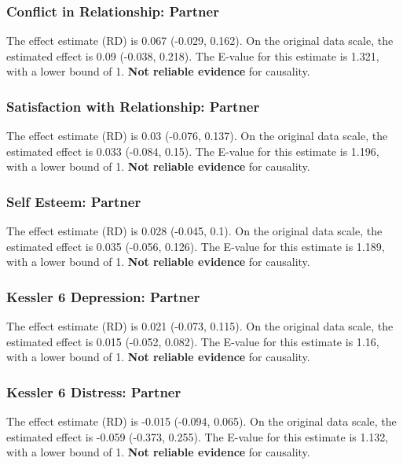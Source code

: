 \documentclass[
  singlecolumn]{article}
\begin{document}
\subsubsection{Conflict in Relationship:
Partner}\label{conflict-in-relationship-partner-15}

The effect estimate (RD) is 0.067 (-0.029, 0.162). On the original data
scale, the estimated effect is 0.09 (-0.038, 0.218). The E-value for
this estimate is 1.321, with a lower bound of 1. \textbf{Not reliable
evidence} for causality.

\subsubsection{Satisfaction with Relationship:
Partner}\label{satisfaction-with-relationship-partner-15}

The effect estimate (RD) is 0.03 (-0.076, 0.137). On the original data
scale, the estimated effect is 0.033 (-0.084, 0.15). The E-value for
this estimate is 1.196, with a lower bound of 1. \textbf{Not reliable
evidence} for causality.

\subsubsection{Self Esteem: Partner}\label{self-esteem-partner-15}

The effect estimate (RD) is 0.028 (-0.045, 0.1). On the original data
scale, the estimated effect is 0.035 (-0.056, 0.126). The E-value for
this estimate is 1.189, with a lower bound of 1. \textbf{Not reliable
evidence} for causality.

\subsubsection{Kessler 6 Depression:
Partner}\label{kessler-6-depression-partner-15}

The effect estimate (RD) is 0.021 (-0.073, 0.115). On the original data
scale, the estimated effect is 0.015 (-0.052, 0.082). The E-value for
this estimate is 1.16, with a lower bound of 1. \textbf{Not reliable
evidence} for causality.

\subsubsection{Kessler 6 Distress:
Partner}\label{kessler-6-distress-partner-15}

The effect estimate (RD) is -0.015 (-0.094, 0.065). On the original data
scale, the estimated effect is -0.059 (-0.373, 0.255). The E-value for
this estimate is 1.132, with a lower bound of 1. \textbf{Not reliable
evidence} for causality.
\end{document}
